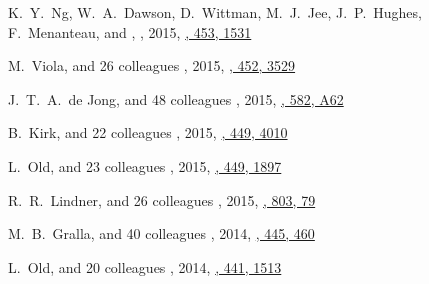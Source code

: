 \begin{etaremune}
\item
K.~Y.~Ng, W.~A.~Dawson, D.~Wittman, M.~J.~Jee, J.~P.~Hughes, F.~Menanteau, and \myself,
,
2015, \href{https://ui.adsabs.harvard.edu/abs/2015MNRAS.453.1531N}{\mnras, 453, 1531}

\item
M.~Viola, and 26 colleagues
,
2015, \href{https://ui.adsabs.harvard.edu/abs/2015MNRAS.452.3529V}{\mnras, 452, 3529}

\item
J.~T.~A.~de Jong, and 48 colleagues
,
2015, \href{https://ui.adsabs.harvard.edu/abs/2015A&A...582A..62D}{\aap, 582, A62}

\item
B.~Kirk, and 22 colleagues
,
2015, \href{https://ui.adsabs.harvard.edu/abs/2015MNRAS.449.4010K}{\mnras, 449, 4010}

\item
L.~Old, and 23 colleagues
,
2015, \href{https://ui.adsabs.harvard.edu/abs/2015MNRAS.449.1897O}{\mnras, 449, 1897}

\item
R.~R.~Lindner, and 26 colleagues
,
2015, \href{https://ui.adsabs.harvard.edu/abs/2015ApJ...803...79L}{\apj, 803, 79}

\item
M.~B.~Gralla, and 40 colleagues
,
2014, \href{https://ui.adsabs.harvard.edu/abs/2014MNRAS.445..460G}{\mnras, 445, 460}

\item
L.~Old, and 20 colleagues
,
2014, \href{https://ui.adsabs.harvard.edu/abs/2014MNRAS.441.1513O}{\mnras, 441, 1513}


\end{etaremune}
